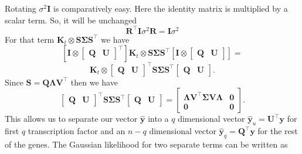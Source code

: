 Rotating $\sigma^2 \mathbf{I}$ is comparatively easy. Here the identity matrix is  multiplied by a scalar term.  So, it will be unchanged 
\begin{equation} \label{eq:RotatingNoise}
\mathbf{R}^\top\mathbf{I}\sigma^2 \mathbf{R}= \mathbf{I}\sigma^2
\end{equation}
For that term $\mathbf{K}_t \otimes \mathbf{S}\boldsymbol{\Sigma}\mathbf{S}^\top$ we have
\begin{equation*} \label{eq:svdONK}
\left[\mathbf{I}\otimes \begin{bmatrix}\mathbf{Q} & \mathbf{U}\end{bmatrix}^\top \right]\mathbf{K}_t \otimes 
\mathbf{S}\boldsymbol{\Sigma}\mathbf{S}^\top
\left[ \mathbf{I} \otimes \begin{bmatrix}\mathbf{Q} & \mathbf{U}\end{bmatrix}\right]
=
\end{equation*} %
\begin{equation}
\mathbf{K}_t \otimes \begin{bmatrix}\mathbf{Q} & \mathbf{U}\end{bmatrix}^\top 
\mathbf{S} \boldsymbol{\Sigma}\mathbf{S}^\top \begin{bmatrix}\mathbf{Q} & \mathbf{U}\end{bmatrix}.
\end{equation}
Since $\mathbf{S} = \mathbf{Q}\boldsymbol{\Lambda}\mathbf{V}^\top$ then we have
\begin{equation} \label{eq:yqprime}
\begin{bmatrix}\mathbf{Q} & \mathbf{U}\end{bmatrix}^\top \mathbf{S}\boldsymbol{\Sigma}\mathbf{S}^\top\begin{bmatrix}\mathbf{Q} & \mathbf{U}\end{bmatrix} 
= 
\begin{bmatrix}\boldsymbol{\Lambda} \mathbf{V}^\top \boldsymbol{\Sigma}\mathbf{V} \boldsymbol{\Lambda} &\mathbf{0} \\ \mathbf{0} & \mathbf{0}\end{bmatrix}.
\end{equation}
This allows us to separate our vector $\hat{\mathbf{y}}$ into a $q$ dimensional vector $\hat{\mathbf{y}}_u = \mathbf{U}^\top \mathbf{y}$ for first $q$ transcription factor and an $n-q$ dimensional vector $\hat{\mathbf{y}}_q =\mathbf{Q}^\top \mathbf{y}$ for the rest of the genes. The Gaussian likelihood for two separate terms can be written as
